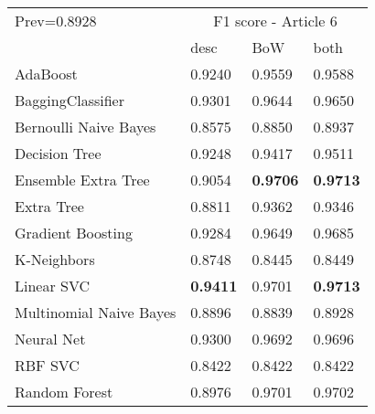 \begin{tabular}{|l|l|l|l| }
\hline
Prev=0.8928 &  \multicolumn{3}{c|}{F1 score - Article 6} \\
\cline{2-4} & desc & BoW & both \\ \hline
AdaBoost                & 0.9240 & 0.9559 & 0.9588\\
BaggingClassifier       & 0.9301 & 0.9644 & 0.9650\\
Bernoulli Naive Bayes   & 0.8575 & 0.8850 & 0.8937\\
Decision Tree           & 0.9248 & 0.9417 & 0.9511\\
Ensemble Extra Tree     & 0.9054 & {\bf 0.9706} & {\bf 0.9713}\\
Extra Tree              & 0.8811 & 0.9362 & 0.9346\\
Gradient Boosting       & 0.9284 & 0.9649 & 0.9685\\
K-Neighbors             & 0.8748 & 0.8445 & 0.8449\\
Linear SVC              & {\bf 0.9411} & 0.9701 & {\bf 0.9713}\\
Multinomial Naive Bayes & 0.8896 & 0.8839 & 0.8928\\
Neural Net              & 0.9300 & 0.9692 & 0.9696\\
RBF SVC                 & 0.8422 & 0.8422 & 0.8422\\
Random Forest           & 0.8976 & 0.9701 & 0.9702\\
\hline
\end{tabular}